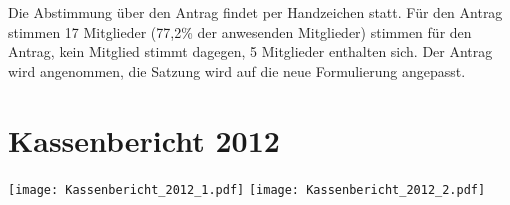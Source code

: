 \documentclass[a4paper,12pt]{scrartcl}
\begin{document}
Die Abstimmung über den Antrag findet per Handzeichen statt. Für den Antrag
stimmen 17 Mitglieder (77{,}2\% der anwesenden Mitglieder) stimmen für den
Antrag, kein Mitglied stimmt dagegen, 5 Mitglieder enthalten sich. Der
Antrag wird angenommen, die Satzung wird auf die neue Formulierung angepasst.

\appendix
\section{Kassenbericht 2012}
\texttt{[image: Kassenbericht\_2012\_1.pdf]}
\newpage
\texttt{[image: Kassenbericht\_2012\_2.pdf]}
\end{document}
